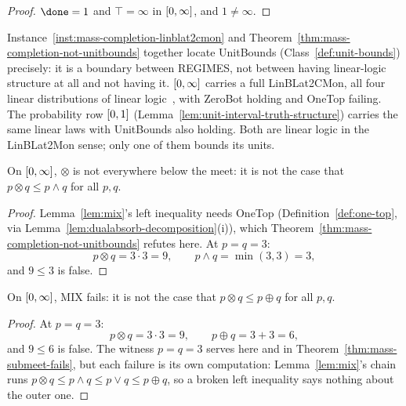 \begin{proof}
\leanok
$\done = 1$ and $\top = \infty$ in $[0,\infty]$, and $1 \ne \infty$.
\end{proof}

Instance~\ref{inst:mass-completion-linblat2cmon} and
Theorem~\ref{thm:mass-completion-not-unitbounds} together locate
UnitBounds (Class~\ref{def:unit-bounds}) precisely: it is a boundary
between REGIMES, not between having linear-logic structure at all and
not having it. $[0,\infty]$ carries a full LinBLat2CMon, all four
linear distributions of linear logic~\citep{girardLinearLogic1987},
with ZeroBot holding and OneTop failing. The probability row
$[0,1]$ (Lemma~\ref{lem:unit-interval-truth-structure}) carries the
same linear laws with UnitBounds also holding. Both are linear logic
in the LinBLat2Mon sense; only one of them bounds its units.

\begin{theorem}
\label{thm:mass-submeet-fails}
\leanok
On $[0,\infty]$, $\otimes$ is not everywhere below the meet: it is not
the case that $p \otimes q \le p \wedge q$ for all $p, q$.
\end{theorem}

\begin{proof}
\leanok
Lemma~\ref{lem:mix}'s left inequality needs OneTop
(Definition~\ref{def:one-top}, via
Lemma~\ref{lem:dualabsorb-decomposition}(i)), which
Theorem~\ref{thm:mass-completion-not-unitbounds} refutes here. At
$p = q = 3$:
\[
  p \otimes q = 3 \cdot 3 = 9, \qquad p \wedge q = \min(3,3) = 3,
\]
and $9 \le 3$ is false.
\end{proof}

\begin{theorem}
\label{thm:mass-mix-fails}
\leanok
On $[0,\infty]$, MIX fails: it is not the case that
$p \otimes q \le p \oplus q$ for all $p, q$.
\end{theorem}

\begin{proof}
\leanok
At $p = q = 3$:
\[
  p \otimes q = 3 \cdot 3 = 9, \qquad p \oplus q = 3 + 3 = 6,
\]
and $9 \le 6$ is false. The witness $p = q = 3$ serves here and in
Theorem~\ref{thm:mass-submeet-fails}, but each failure is its own
computation: Lemma~\ref{lem:mix}'s chain runs
$p \otimes q \le p \wedge q \le p \vee q \le p \oplus q$, so a broken
left inequality says nothing about the outer one.
\end{proof}

